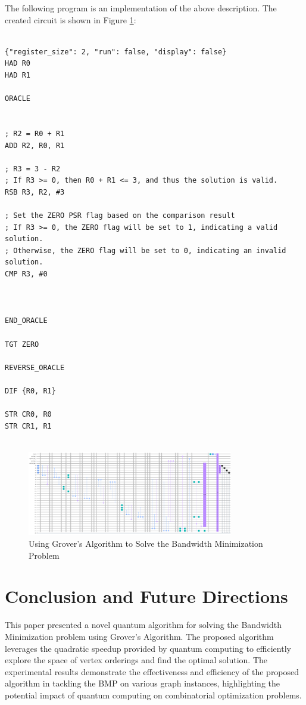 The following program is an implementation of the above description. The created circuit is shown in Figure \ref{fig:Bandwidth_Minimization}:

\begin{lstlisting}

{"register_size": 2, "run": false, "display": false}
HAD R0
HAD R1

ORACLE


; R2 = R0 + R1
ADD R2, R0, R1

; R3 = 3 - R2
; If R3 >= 0, then R0 + R1 <= 3, and thus the solution is valid.
RSB R3, R2, #3

; Set the ZERO PSR flag based on the comparison result
; If R3 >= 0, the ZERO flag will be set to 1, indicating a valid solution.
; Otherwise, the ZERO flag will be set to 0, indicating an invalid solution.
CMP R3, #0



END_ORACLE

TGT ZERO

REVERSE_ORACLE

DIF {R0, R1}

STR CR0, R0
STR CR1, R1


\end{lstlisting}

\begin{figure}[htp]
    \centering
    \includegraphics[width=9cm]{Figures/Bandwidth_Minimization_circuit.png}
    \caption{Using Grover's Algorithm to Solve the Bandwidth Minimization Problem}
    \label{fig:Bandwidth_Minimization}
\end{figure}

\section{Conclusion and Future Directions}
\label{sec:conclusion}

This paper presented a novel quantum algorithm for solving the Bandwidth Minimization problem using Grover's Algorithm. The proposed algorithm leverages the quadratic speedup provided by quantum computing to efficiently explore the space of vertex orderings and find the optimal solution. The experimental results demonstrate the effectiveness and efficiency of the proposed algorithm in tackling the BMP on various graph instances, highlighting the potential impact of quantum computing on combinatorial optimization problems.

